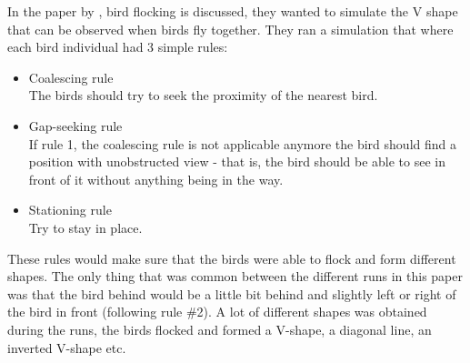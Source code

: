 In the paper \citep{Nathan2008} by \citeauthor{Nathan2008}, bird flocking is discussed, they wanted to simulate the V shape that can be observed when birds fly together. They ran a simulation that where each bird individual had 3 simple rules: 
\begin{itemize}
    \item Coalescing rule \\
        The birds should try to seek the proximity of the nearest bird.
    \item Gap-seeking rule \\
        If rule 1, the coalescing rule is not applicable anymore the bird should find a position with unobstructed view -  that is, the bird should be able to see in front of it without anything being in the way.
    \item Stationing rule \\
        Try to stay in place.
\end{itemize}
These rules would make sure that the birds were able to flock and form different shapes. The only thing that was common between the different runs in this paper was that the bird behind would be a little bit behind and slightly left or right of the bird in front (following rule \#2). A lot of different shapes was obtained during the runs, the birds flocked and formed a V-shape, a diagonal line, an inverted V-shape etc.

